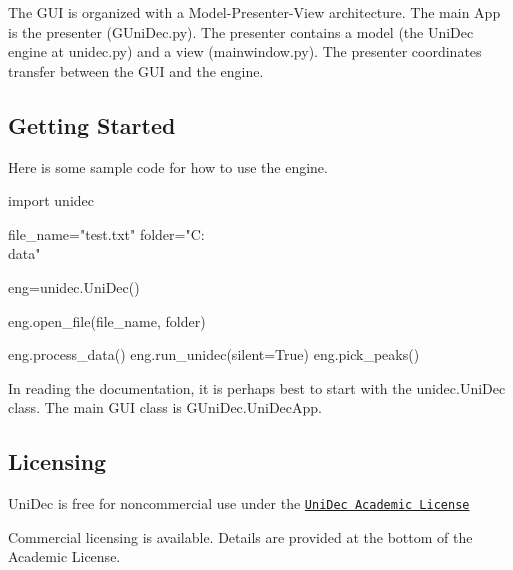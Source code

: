 The G\+U\+I is organized with a Model-\/\+Presenter-\/\+View architecture. The main App is the presenter (G\+Uni\+Dec.\+py). The presenter contains a model (the Uni\+Dec engine at unidec.\+py) and a view (mainwindow.\+py). The presenter coordinates transfer between the G\+U\+I and the engine.

\subsection*{Getting Started}

Here is some sample code for how to use the engine. \begin{DoxyVerb}import unidec

file_name="test.txt"
folder="C:\\data"

eng=unidec.UniDec()

eng.open_file(file_name, folder)

eng.process_data()
eng.run_unidec(silent=True)
eng.pick_peaks()
\end{DoxyVerb}


In reading the documentation, it is perhaps best to start with the unidec.\+Uni\+Dec class. The main G\+U\+I class is G\+Uni\+Dec.\+Uni\+Dec\+App.

\subsection*{Licensing}

Uni\+Dec is free for noncommercial use under the \href{http://unidec.chem.ox.ac.uk/12116_UniDec_Academic%20Use%20Licence.pdf}{\tt Uni\+Dec Academic License}

Commercial licensing is available. Details are provided at the bottom of the Academic License. 